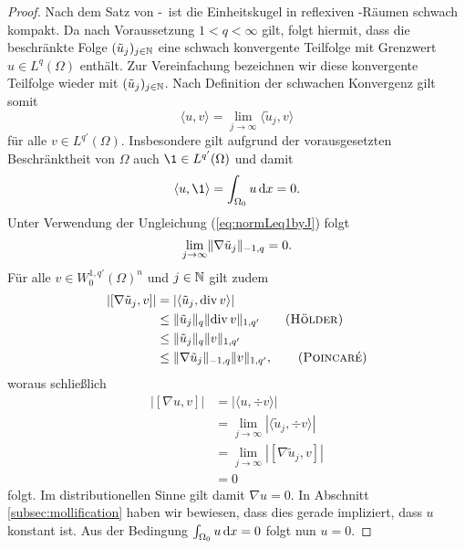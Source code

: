 \begin{proof}
  Nach dem Satz von \banach\hyp{}\alaoglu\ ist die Einheitskugel in reflexiven \banach\hyp{}Räumen schwach kompakt.
  Da nach Voraussetzung $1 < q < \infty$ gilt, folgt hiermit, dass die beschränkte Folge $(\tilde u_j)_{j \in \mathbb{N}}$ eine schwach konvergente Teilfolge mit Grenzwert $u \in L^q(\Omega)$ enthält.
  Zur Vereinfachung bezeichnen wir diese konvergente Teilfolge wieder mit $(\tilde u_j)_{j \in \mathbb{N}}$.
  Nach Definition der schwachen Konvergenz gilt somit
  $$
  \langle u, v \rangle = \lim_{j \to \infty} \langle \tilde u_j, v \rangle
  $$
  für alle $v \in L^{q'}(\Omega)$.
  Insbesondere gilt aufgrund der vorausgesetzten Beschränktheit von $\Omega$ auch $\1 \in L^{q'}(\Omega)$ und damit
  $$
  \langle u, \1 \rangle = \int_{\Omega_0} u \d x = 0.
  $$
  Unter Verwendung der Ungleichung (\ref{eq:normLeq1byJ}) folgt
  \begin{equation}
    \label{eq:limNablaU}
    \lim_{j \to \infty} \lVert \nabla \tilde u_j \rVert_{-1,q} = 0. 
  \end{equation}
  Für alle $v \in W_0^{1,q'}(\Omega)^n$ und $j \in \mathbb{N}$ gilt zudem 
  \begin{align*}
    |[\nabla \tilde u_j, v]|
    &= |\langle \tilde u_j, \div v \rangle| \\
    &\leq \norm{\tilde u_j}_q \norm{\div v}_{1,q'} \tag{\hoelder}\\
    &\leq \norm{\tilde u_j}_q \norm{v}_{1,q'} \\
    &\leq \norm{\nabla \tilde u_j}_{-1,q} \norm{v}_{1,q'}, \tag{\poincare}
  \end{align*}
  woraus schließlich
  \begin{align*}
    |[\nabla u, v]|
    &= |\langle u, \div v \rangle| \\
    &= \lim_{j \to \infty}|\langle \tilde u_j, \div v \rangle| \\
    &= \lim_{j \to \infty} |[\nabla \tilde u_j, v ]| \\
    &= 0
  \end{align*}
  folgt.
  Im distributionellen Sinne gilt damit $\nabla u = 0$.
  In Abschnitt \ref{subsec:mollification} haben wir bewiesen, dass dies gerade impliziert, dass $u$ konstant ist.
  Aus der Bedingung $\int_{\Omega_0} u \, {\operatorname{d}\!{x}} = 0$ folgt nun $u = 0$. 
  

\end{proof}
